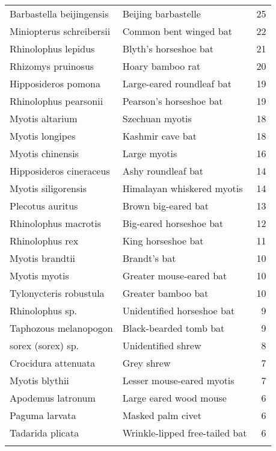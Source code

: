 \documentclass[11pt,article,oneside]{article}
\begin{document}
\begin{longtable}[c]{@{}llr@{}}
\\\addlinespace
Barbastella beijingensis & Beijing barbastelle & 25
\\\addlinespace
Miniopterus schreibersii & Common bent winged bat & 22
\\\addlinespace
Rhinolophus lepidus & Blyth's horseshoe bat & 21
\\\addlinespace
Rhizomys pruinosus & Hoary bamboo rat & 20
\\\addlinespace
Hipposideros pomona & Large-eared roundleaf bat & 19
\\\addlinespace
Rhinolophus pearsonii & Pearson's horseshoe bat & 19
\\\addlinespace
Myotis altarium & Szechuan myotis & 18
\\\addlinespace
Myotis longipes & Kashmir cave bat & 18
\\\addlinespace
Myotis chinensis & Large myotis & 16
\\\addlinespace
Hipposideros cineraceus & Ashy roundleaf bat & 14
\\\addlinespace
Myotis siligorensis & Himalayan whiskered myotis & 14
\\\addlinespace
Plecotus auritus & Brown big-eared bat & 13
\\\addlinespace
Rhinolophus macrotis & Big-eared horseshoe bat & 12
\\\addlinespace
Rhinolophus rex & King horseshoe bat & 11
\\\addlinespace
Myotis brandtii & Brandt's bat & 10
\\\addlinespace
Myotis myotis & Greater mouse-eared bat & 10
\\\addlinespace
Tylonycteris robustula & Greater bamboo bat & 10
\\\addlinespace
Rhinolophus sp. & Unidentified horseshoe bat & 9
\\\addlinespace
Taphozous melanopogon & Black-bearded tomb bat & 9
\\\addlinespace
sorex (sorex) sp. & Unidentified shrew & 8
\\\addlinespace
Crocidura attenuata & Grey shrew & 7
\\\addlinespace
Myotis blythii & Lesser mouse-eared myotis & 7
\\\addlinespace
Apodemus latronum & Large eared wood mouse & 6
\\\addlinespace
Paguma larvata & Masked palm civet & 6
\\\addlinespace
Tadarida plicata & Wrinkle-lipped free-tailed bat & 6
\\\addlinespace

\end{longtable}
\end{document}

